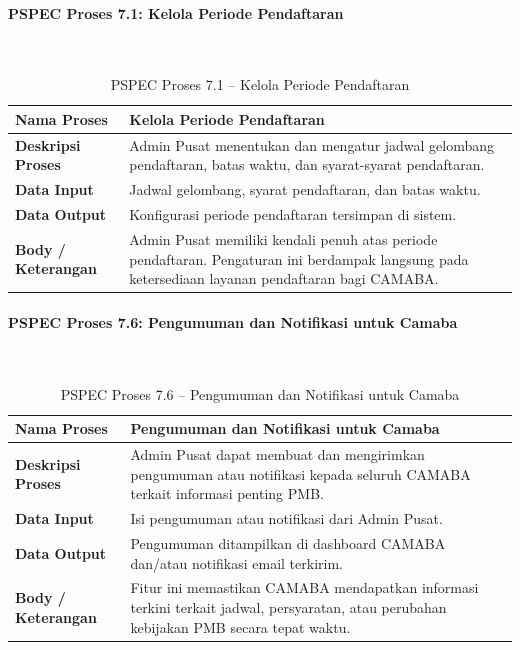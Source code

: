 \paragraph{PSPEC Proses 7.1: Kelola Periode Pendaftaran}~\\
\begin{longtable}{|p{}|p{}|}
	\caption{PSPEC Proses 7.1 -- Kelola Periode Pendaftaran}
	\label{table:3.pspec71}\\
	\hline
	\textbf{Nama Proses} & Kelola Periode Pendaftaran \\
	\hline
	\textbf{Deskripsi Proses} & Admin Pusat menentukan dan mengatur jadwal gelombang pendaftaran, batas waktu, dan syarat-syarat pendaftaran. \\
	\hline
	\textbf{Data Input} & Jadwal gelombang, syarat pendaftaran, dan batas waktu. \\
	\hline
	\textbf{Data Output} & Konfigurasi periode pendaftaran tersimpan di sistem. \\
	\hline
	\textbf{Body / Keterangan} & Admin Pusat memiliki kendali penuh atas periode pendaftaran. Pengaturan ini berdampak langsung pada ketersediaan layanan pendaftaran bagi CAMABA. \\
	\hline
\end{longtable}

\paragraph{PSPEC Proses 7.6: Pengumuman dan Notifikasi untuk Camaba}~\\
\begin{longtable}{|p{}|p{}|}
	\caption{PSPEC Proses 7.6 -- Pengumuman dan Notifikasi untuk Camaba}
	\label{table:3.pspec76}\\
	\hline
	\textbf{Nama Proses} & Pengumuman dan Notifikasi untuk Camaba \\
	\hline
	\textbf{Deskripsi Proses} & Admin Pusat dapat membuat dan mengirimkan pengumuman atau notifikasi kepada seluruh CAMABA terkait informasi penting PMB. \\
	\hline
	\textbf{Data Input} & Isi pengumuman atau notifikasi dari Admin Pusat. \\
	\hline
	\textbf{Data Output} & Pengumuman ditampilkan di dashboard CAMABA dan/atau notifikasi email terkirim. \\
	\hline
	\textbf{Body / Keterangan} & Fitur ini memastikan CAMABA mendapatkan informasi terkini terkait jadwal, persyaratan, atau perubahan kebijakan PMB secara tepat waktu. \\
	\hline
\end{longtable}

